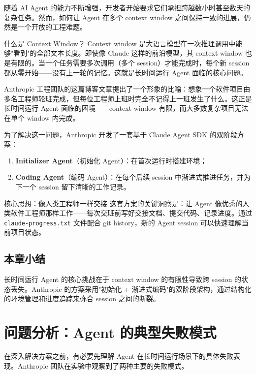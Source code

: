 \documentclass[a4paper]{article}
\begin{document}
随着 AI Agent 的能力不断增强，开发者开始要求它们承担跨越数小时甚至数天的复杂任务。然而，如何让 Agent 在多个 context window 之间保持一致的进展，仍然是一个开放的工程难题。

\begin{knowledgebox}{什么是 Context Window？}
Context window 是大语言模型在一次推理调用中能够"看到"的全部文本长度。即使像 Claude 这样的前沿模型，其 context window 也是有限的。当一个任务需要多次调用（多个 session）才能完成时，每个新 session 都从零开始——没有上一轮的记忆。这就是长时间运行 Agent 面临的核心问题。
\end{knowledgebox}

Anthropic 工程团队的这篇博客文章提出了一个形象的比喻：想象一个软件项目由多名工程师轮班完成，但每位工程师上班时完全不记得上一班发生了什么。这正是长时间运行 Agent 面临的困境——context window 有限，而大多数复杂项目无法在单个 window 内完成。

为了解决这一问题，Anthropic 开发了一套基于 Claude Agent SDK 的双阶段方案：
\begin{enumerate}
    \item \textbf{Initializer Agent}（初始化 Agent）：在首次运行时搭建环境；
    \item \textbf{Coding Agent}（编码 Agent）：在每个后续 session 中渐进式推进任务，并为下一个 session 留下清晰的工作记录。
\end{enumerate}

\begin{importantbox}{核心思想：像人类工程师一样交接}
这套方案的关键洞察是：让 Agent 像优秀的人类软件工程师那样工作——每次交班前写好交接文档、提交代码、记录进度。通过 \texttt{claude-progress.txt} 文件配合 git history，新的 Agent session 可以快速理解当前项目状态。
\end{importantbox}

\subsection{本章小结}

长时间运行 Agent 的核心挑战在于 context window 的有限性导致跨 session 的状态丢失。Anthropic 的方案采用"初始化 + 渐进式编码"的双阶段架构，通过结构化的环境管理和进度追踪来弥合 session 之间的断裂。


\section{问题分析：Agent 的典型失败模式}

在深入解决方案之前，有必要先理解 Agent 在长时间运行场景下的具体失败表现。Anthropic 团队在实验中观察到了两种主要的失败模式。
\end{document}
